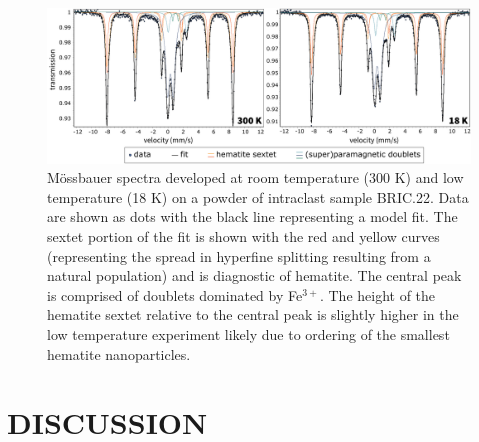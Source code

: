 \documentclass[draft]{agujournal2019}
\begin{document}
\begin{figure}[!ht]
\noindent\includegraphics[width=\textwidth]{Fig7_mossbauer.pdf}
\caption{\small{M{\"o}ssbauer spectra developed at room temperature (300 K) and low temperature (18 K) on a powder of intraclast sample BRIC.22. Data are shown as dots with the black line representing a model fit. The sextet portion of the fit is shown with the red and yellow curves (representing the spread in hyperfine splitting resulting from a natural population) and is diagnostic of hematite. The central peak is comprised of doublets dominated by Fe$^{3+}$. The height of the hematite sextet relative to the central peak is slightly higher in the low temperature experiment likely due to ordering of the smallest hematite nanoparticles.}}
\label{fig:mossbauer}
\end{figure}

\section*{DISCUSSION}
\end{document}
